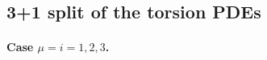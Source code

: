 \documentclass[
10pt, %
a4paper, %
oneside, %
twocolumn,
headinclude,footinclude, %
BCOR5mm, %
]{scrartcl}
\newcommand{\IP}[1]{{\color{Red}[IP:\ \ #1]}}
\newcommand{\Dm}[2]{D_{\phantom{#2}#1}^{#2}}	%
\newcommand{\aD}[2]{\mathcal{D}_{\phantom{#2}#1}^{#2}}	%
\newcommand{\Bm}[2]{B^{#1#2}}	%
\newcommand{\aB}[2]{\mathcal{B}^{#1#2}}	%
\newcommand{\Um}{U}%
\newcommand{\LCsymb}{\bm{\in}}    %
\begin{document}
	
	
	\subsection{3+1 split of the torsion PDEs}	\label{ssec.31.tors}
	
	
	\paragraph{Case $ \mu = i=1,2,3 $.} 
	
\end{document}
